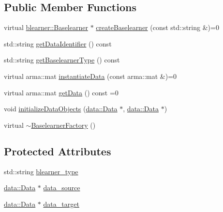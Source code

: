 \subsection*{Public Member Functions}
\begin{DoxyCompactItemize}
\item 
virtual \hyperlink{classblearner_1_1_baselearner}{blearner\+::\+Baselearner} $\ast$ \hyperlink{classblearnerfactory_1_1_baselearner_factory_ac3584a20a84834099a15908690b837bb}{create\+Baselearner} (const std\+::string \&)=0
\item 
std\+::string \hyperlink{classblearnerfactory_1_1_baselearner_factory_a40703963bb3fd273b835a99263d9b599}{get\+Data\+Identifier} () const
\item 
std\+::string \hyperlink{classblearnerfactory_1_1_baselearner_factory_a05d5c00f7a434548868c4ad21d0f5fda}{get\+Baselearner\+Type} () const
\item 
virtual arma\+::mat \hyperlink{classblearnerfactory_1_1_baselearner_factory_ac4a38c4815fb33b8d4785745117c5e57}{instantiate\+Data} (const arma\+::mat \&)=0
\item 
virtual arma\+::mat \hyperlink{classblearnerfactory_1_1_baselearner_factory_aa3e4580bca870ca3b742dda6c820e1e6}{get\+Data} () const =0
\item 
void \hyperlink{classblearnerfactory_1_1_baselearner_factory_a147d4ef123ec382fe402d562a91df4d2}{initialize\+Data\+Objects} (\hyperlink{classdata_1_1_data}{data\+::\+Data} $\ast$, \hyperlink{classdata_1_1_data}{data\+::\+Data} $\ast$)
\item 
virtual \hyperlink{classblearnerfactory_1_1_baselearner_factory_adc9d1d3c8fc774c9d856117632c8aadb}{$\sim$\+Baselearner\+Factory} ()
\end{DoxyCompactItemize}
\subsection*{Protected Attributes}
\begin{DoxyCompactItemize}
\item 
std\+::string \hyperlink{classblearnerfactory_1_1_baselearner_factory_a3382b7d9833484f63755a26447a5d2e4}{blearner\+\_\+type}
\item 
\hyperlink{classdata_1_1_data}{data\+::\+Data} $\ast$ \hyperlink{classblearnerfactory_1_1_baselearner_factory_a6194191695958b4035d3ea0841c2320c}{data\+\_\+source}
\item 
\hyperlink{classdata_1_1_data}{data\+::\+Data} $\ast$ \hyperlink{classblearnerfactory_1_1_baselearner_factory_af2cb5c226c90469c6a70b677214ecc2f}{data\+\_\+target}
\end{DoxyCompactItemize}


